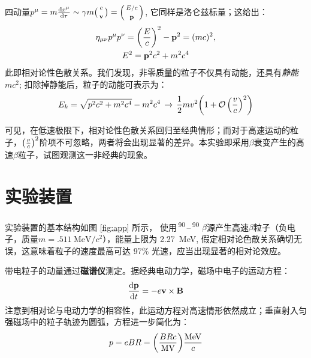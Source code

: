 \documentclass[aps,pre,12pt,preprint,%
	onecolumn,showpacs,showkeys,nofootinbib]{revtex4-1}
\newcommand{\SrAtom}{\,\textsuperscript{90}\tup{Sr}\,}
\newcommand{\Yatom}{\,\textsuperscript{90}\tup{Y}\,}
\begin{document}
	四动量$p^\mu = m\dv{x^\mu}{\tau} \sim \gamma m
		\pqty{\begin{smallmatrix}
			c \\[1ex] \vb{v}
		\end{smallmatrix}}
		=
		\pqty{\begin{smallmatrix}
			E/c \\[1ex] \vb{p}
		\end{smallmatrix}}$, 它同样是洛仑兹标量；这给出：
	\begin{equation}
	\begin{gathered}
		\eta_{\mu\nu} p^\mu p^\nu
		= \pqty{\frac{E}{c}}^2 - \vb{p}^2 = (mc)^2,\\
		E^2 = \vb{p}^2 c^2 + m^2 c^4
		\label{eq:E-Prelations}
	\end{gathered}
	\end{equation}
	此即相对论性色散关系。我们发现，非零质量的粒子不仅具有动能，还具有\textit{静能}$mc^2$; 扣除掉静能后，粒子的动能可表示为：
	\begin{equation}
		E_k = \sqrt{p^2 c^2 + m^2 c^4} - m^2 c^4
		\,\to\, \frac{1}{2} mv^2 \pqty{
			1 + \mcal{O}\,\pqty{\frac{v}{c}}^2
		}
	\label{eq:relativityEk}
	\end{equation}
	
	可见，在低速极限下，相对论性色散关系回归至经典情形；而对于高速运动的粒子，$\pqty{\frac{v}{c}}^2$阶项不可忽略，两者将会出现显著的差异。本实验即采用$\beta$衰变产生的高速$\beta$粒子，试图观测这一非经典的现象。
\section{实验装置}
	实验装置的基本结构如图 \ref{fig:app} 所示，
	使用\SrAtom--\Yatom\,$\beta$源产生高速$\beta$粒子（负电子，质量$m = \SI{.511}{\MeV/c^2}$），能量上限为 \SI{2.27}{\MeV}, 假定相对论色散关系确切无误，这意味着粒子的速度最高可达 97\% 光速，应当出现显著的相对论效应。
	
	带电粒子的动量通过\textbf{磁谱仪}测定。据经典电动力学，磁场中电子的运动方程：
	\begin{equation}
		\dv{\vb{p}}{t} = -e\vb{v}\times\vb{B}
	\end{equation}
	注意到相对论与电动力学的相容性，此运动方程对高速情形依然成立；垂直射入匀强磁场中的粒子轨迹为圆弧，方程进一步简化为：
	\begin{equation}
		p = eBR = \pqty{\frac{BRc}{\si{M\V}}} \frac{\si{\MeV}}{c}
	\end{equation}
	
\end{document}
